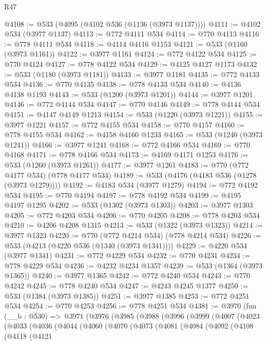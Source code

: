 \begin{lexlean}{R47}
\begin{coremodule}
@4108 := @533 (@4095 (@4102 @536 (@1136 (@3973 @1137))))
@4111 := @4102 @534 (@3977 @1137)
@4113 := @772 @4111 @534
@4114 := @770 @4113
@4116 := @778 @4111 @534
@4118 := @4114 @4116 @1153
@4121 := @533 (@1160 (@3973 @1161))
@4122 := @3977 @1161
@4124 := @772 @4122 @534
@4125 := @770 @4124
@4127 := @778 @4122 @534
@4129 := @4125 @4127 @1173
@4132 := @533 (@1180 (@3973 @1181))
@4133 := @3977 @1181
@4135 := @772 @4133 @534
@4136 := @770 @4135
@4138 := @778 @4133 @534
@4140 := @4136 @4138 @1193
@4143 := @533 (@1200 (@3973 @1201))
@4144 := @3977 @1201
@4146 := @772 @4144 @534
@4147 := @770 @4146
@4149 := @778 @4144 @534
@4151 := @4147 @4149 @1213
@4154 := @533 (@1220 (@3973 @1221))
@4155 := @3977 @1221
@4157 := @772 @4155 @534
@4158 := @770 @4157
@4160 := @778 @4155 @534
@4162 := @4158 @4160 @1233
@4165 := @533 (@1240 (@3973 @1241))
@4166 := @3977 @1241
@4168 := @772 @4166 @534
@4169 := @770 @4168
@4171 := @778 @4166 @534
@4173 := @4169 @4171 @1253
@4176 := @533 (@1260 (@3973 @1261))
@4177 := @3977 @1261
@4183 := @770 (@772 @4177 @534) (@778 @4177 @534)
@4189 := @533 (@4176 (@4183 @536 (@1278 (@3973 @1279))))
@4192 := @4183 @534 (@3977 @1279)
@4194 := @772 @4192 @534
@4195 := @770 @4194
@4197 := @778 @4192 @534
@4199 := @4195 @4197 @1295
@4202 := @533 (@1302 (@3973 @1303))
@4203 := @3977 @1303
@4205 := @772 @4203 @534
@4206 := @770 @4205
@4208 := @778 @4203 @534
@4210 := @4206 @4208 @1315
@4213 := @533 (@1322 (@3973 @1323))
@4214 := @3977 @1323
@4220 := @770 (@772 @4214 @534) (@778 @4214 @534)
@4226 := @533 (@4213 (@4220 @536 (@1340 (@3973 @1341))))
@4229 := @4220 @534 (@3977 @1341)
@4231 := @772 @4229 @534
@4232 := @770 @4231
@4234 := @778 @4229 @534
@4236 := @4232 @4234 @1357
@4239 := @533 (@1364 (@3973 @1365))
@4240 := @3977 @1365
@4242 := @772 @4240 @534
@4243 := @770 @4242
@4245 := @778 @4240 @534
@4247 := @4243 @4245 @1377
@4250 := @533 (@1384 (@3973 @1385))
@4251 := @3977 @1385
@4253 := @772 @4251 @534
@4254 := @770 @4253
@4256 := @778 @4251 @534
@4381 := @3970
    (fun (__b : @530) =>
    @3971
      (@3976
        (@3985
          (@3988
            (@3996
              (@3999
                (@4007
                  (@4023
                    (@4033
                      (@4036
                        (@4044
                          (@4060
                            (@4070
                              (@4073
                                (@4081
                                  (@4084
                                    (@4092
                                      (@4108
                                        (@4118
                                          (@4121

\end{coremodule}
\end{lexlean}
